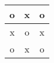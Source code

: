 \documentclass{article}
\begin{document}
\vspace*{\fill} \vspace*{-5ex}

\begin{tabular}{||c|c|c|}
\hline
o & x & o\\\hline
x & o & x\\ \hline
o & x & o\\\hline
\end{tabular}

\vspace*{\fill}
\end{document}
